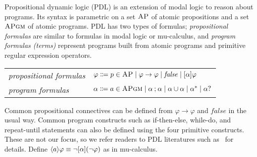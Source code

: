 \documentclass[acmsmall,review,anonymous]{acmart}
\newcommand{\imp}{\to}
\newcommand{\AP}{\textsc{AP}}
\newcommand{\APgm}{\textsc{APgm}}
\newcommand{\false}{\mathit{false}}
\DeclarePairedDelimiter{\angleBraces}{\langle}{\rangle}
\newcommand{\PDLseq}{\mathbin{;}}
\newcommand{\PDLunion}{\mathbin{\cup}}
\newcommand{\PDLstar}{^*}
\newcommand{\PDLquestion}{{?}}
\begin{document}
Propositional dynamic logic (PDL) is an extension of modal logic
to reason about programs.
Its syntax is parametric on a set $\AP$ of atomic propositions
and a set $\APgm$ of atomic programs.
PDL has two types of formulas;
\emph{propositional formulas} are similar to formulas in modal logic or mu-calculus,
and \emph{program formulas (terms)} represent programs built from atomic programs
and primitive regular expression operators.
\begin{center}
\begin{tabular}{ll}
\emph{propositional formulas} &
$\varphi \Coloneqq
p \in \AP \mid
\varphi \to \varphi \mid
\false \mid
[\alpha] \varphi$
\\
\emph{program formulas} &
$\alpha \Coloneqq
a \in \APgm \mid
\alpha \PDLseq \alpha \mid
\alpha \PDLunion \alpha \mid
\alpha \PDLstar \mid
\alpha \PDLquestion $
\end{tabular}
\end{center}
Common propositional connectives can be defined
from $\varphi \imp \varphi$ and $\false$ in the usual way.
Common program constructs such as if-then-else,
while-do, and repeat-until statements can also be defined using the four primitive constructs.
These are not our focus, so we refer readers to PDL literatures such as~\cite{bibid}
for details.
Define $\angleBraces{a} \varphi \equiv \neg [\alpha] (\neg \varphi)$ as in mu-calculus.
\end{document}
